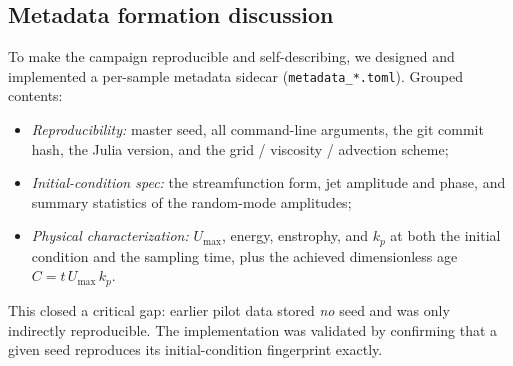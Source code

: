 \documentclass[11pt]{article}
\newcommand{\code}[1]{\texttt{\small #1}}
\begin{document}
\subsection{Metadata formation discussion}
To make the campaign reproducible and self-describing, we designed and implemented
a per-sample metadata sidecar (\code{metadata\_*.toml}). Grouped contents:
\begin{itemize}
  \item \emph{Reproducibility:} master seed, all command-line arguments, the git
        commit hash, the Julia version, and the grid / viscosity / advection scheme;
  \item \emph{Initial-condition spec:} the streamfunction form, jet amplitude and
        phase, and summary statistics of the random-mode amplitudes;
  \item \emph{Physical characterization:} $U_{\max}$, energy, enstrophy, and $k_p$
        at both the initial condition and the sampling time, plus the achieved
        dimensionless age $C = t\,U_{\max}\,k_p$.
\end{itemize}
This closed a critical gap: earlier pilot data stored \emph{no} seed and was only
indirectly reproducible. The implementation was validated by confirming that a
given seed reproduces its initial-condition fingerprint exactly.
\end{document}

